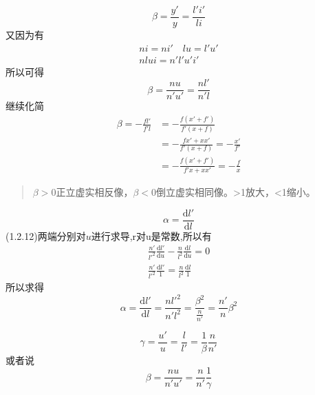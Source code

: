 \begin{description}[leftmargin=0.7cm,style=nextline,nosep]%
    \item[横向放大率] 
     \begin{equation}
     \beta=\frac{y'}{y}=\frac{l'i'}{li}\tag{1.2.20}
     \end{equation}
     又因为有
\begin{align}
    ni=ni' \quad lu=l'u' \tag{1.2.21.bre 1}\\
        nlui=n'l'u'i'  \tag{1.2.21.bre 2}
\end{align}
所以可得
\begin{equation}
\beta=\frac{nu}{n'u'}=\frac{nl'}{n'l} \tag{1.2.21}
\end{equation}
继续化简
\begin{equation}
\begin{aligned}
    \beta=-\frac{fl'}{f'l}&=-\frac{f(x'+f')}{f'(x+f)}
    \\
    &=-\frac{fx'+xx'}{f'(x+f)}=-\frac{x'}{f'}\\
    &=-\frac{f(x'+f')}{f'x+xx'}=-\frac{f}{x}
\end{aligned}
\tag{1.ad.3}
\end{equation}
\begin{quote}
{\ccwd\kaishu{}
$\beta>0$正立虚实相反像，$\beta<0$倒立虚实相同像。>1放大，<1缩小。
}
\end{quote}
    \item[横向(垂轴)放大率] 
    \begin{equation}
    \alpha=\frac{\mathrm{d}{ l'}}{\mathrm{d}{l}} \tag{1.2.22.a}
    \end{equation}
    (1.2.12)两端分别对$u$进行求导,r对u是常数,所以有
    \begin{align}
      \frac{n'}{l'^2}\frac{\mathrm{d}{l'}}{\mathrm{d}{u}}-\frac{n}{l^2}\frac{\mathrm{d}{l}}{\mathrm{d}{u}}=0 \tag{1.2.22.bef 1}\\ 
      \frac{n'}{l'^2}\frac{\mathrm{d}{l'}}{1}=\frac{n}{l^2}\frac{\mathrm{d}{l}}{1}\tag{1.2.22.bef 1}
    \end{align}
    所以求得
    \begin{equation}
    \alpha=\frac{\mathrm{d}{l'}}{\mathrm{d}{l}}=\frac{nl'^2}{n'l^2}=\frac{\beta^2}{\frac{n}{n'}}=\frac{n'}{n}\beta^2 \tag{1.2.22}
    \end{equation}

    \item[角放大率]
    \begin{equation}
    \gamma=\frac{u'}{u}=\frac{l}{l'}=\frac{1}{\beta}\frac{n}{n'} \tag{1.2.23}
    \end{equation} 
    或者说
    \begin{equation}
    \beta=\frac{nu}{n'u'}=\frac{n}{n'} \frac{1}{\gamma} \tag{1.add.4}
    \end{equation}
\end{description}

